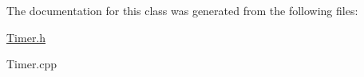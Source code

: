 The documentation for this class was generated from the following files\+:\begin{DoxyCompactItemize}
\item 
\hyperlink{_timer_8h}{Timer.\+h}\item 
Timer.\+cpp\end{DoxyCompactItemize}
